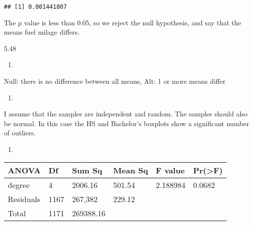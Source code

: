 \documentclass[]{article}
\begin{document}
\begin{verbatim}
## [1] 0.001441807
\end{verbatim}

The p value is less than 0.05, so we reject the null hypothesis, and say
that the means fuel milage differs.

5.48

\begin{enumerate}
\def\labelenumi{\alph{enumi}.}
\item
\end{enumerate}

Null: there is no difference between all means, Alt: 1 or more means
differ

\begin{enumerate}
\def\labelenumi{\alph{enumi}.}
\setcounter{enumi}{1}
\item
\end{enumerate}

I assume that the samples are independent and random. The samples should
also be normal. In this case the HS and Bachelor's boxplots show a
significant number of outliers.

\begin{enumerate}
\def\labelenumi{\alph{enumi}.}
\setcounter{enumi}{2}
\item
\end{enumerate}

\begin{longtable}[c]{@{}llllll@{}}
\toprule
ANOVA & Df & Sum Sq & Mean Sq & F value &
Pr(\textgreater{}F)\tabularnewline
\midrule
\endhead
degree & 4 & 2006.16 & 501.54 & 2.188984 & 0.0682\tabularnewline
Residuals & 1167 & 267,382 & 229.12 & &\tabularnewline
Total & 1171 & 269388.16 & & &\tabularnewline
\bottomrule
\end{longtable}
\end{document}
